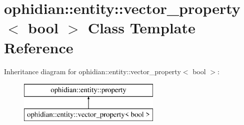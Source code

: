 \hypertarget{classophidian_1_1entity_1_1vector__property_3_01bool_01_4}{\section{ophidian\-:\-:entity\-:\-:vector\-\_\-property$<$ bool $>$ Class Template Reference}
\label{classophidian_1_1entity_1_1vector__property_3_01bool_01_4}
}
Inheritance diagram for ophidian\-:\-:entity\-:\-:vector\-\_\-property$<$ bool $>$\-:\begin{figure}[H]
\begin{center}
\leavevmode
\includegraphics[height=2.000000cm]{classophidian_1_1entity_1_1vector__property_3_01bool_01_4}
\end{center}
\end{figure}
